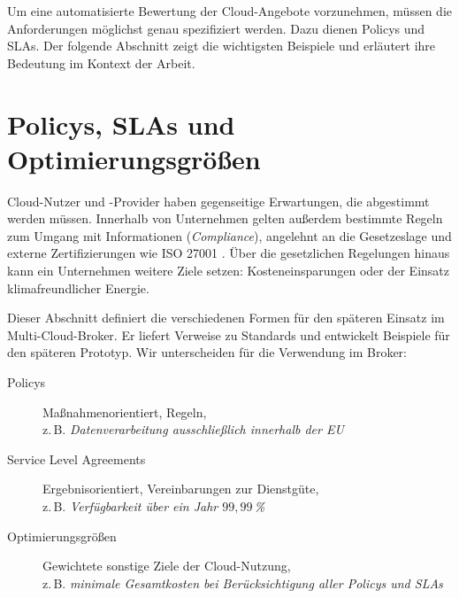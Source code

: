 Um eine automatisierte Bewertung der Cloud-Angebote vorzunehmen, müssen die Anforderungen möglichst genau spezifiziert werden. Dazu dienen Policys und SLAs. Der folgende Abschnitt zeigt die wichtigsten Beispiele und erläutert ihre Bedeutung im Kontext der Arbeit.

%

%
%


\section{Policys, SLAs und Optimierungsgrößen}

Cloud-Nutzer und -Provider haben gegenseitige Erwartungen, die abgestimmt werden müssen. Innerhalb von Unternehmen gelten außerdem bestimmte Regeln zum Umgang mit Informationen (\emph{Compliance}), angelehnt an die Gesetzeslage und externe Zertifizierungen wie ISO 27001 \cite{iso:2013:27001}. Über die gesetzlichen Regelungen hinaus kann ein Unternehmen weitere Ziele setzen: Kosteneinsparungen oder der Einsatz klimafreundlicher Energie. 

Dieser Abschnitt definiert die verschiedenen Formen für den späteren Einsatz im Multi-Cloud-Broker. Er liefert Verweise zu Standards und entwickelt Beispiele für den späteren Prototyp. Wir unterscheiden für die Verwendung im Broker:

\begin{description}
	\item[Policys] Maßnahmenorientiert, Regeln, \\
	z.\,B. \emph{Datenverarbeitung ausschließlich innerhalb der EU}
	\item[Service Level Agreements] Ergebnisorientiert, Vereinbarungen zur Dienstgüte, \\
	z.\,B. \emph{Verfügbarkeit über ein Jahr $99,99\,$\%}
	\item[Optimierungsgrößen] Gewichtete sonstige Ziele der Cloud-Nutzung, \\
	z.\,B. \emph{minimale Gesamtkosten bei Berücksichtigung aller Policys und SLAs}
\end{description}

